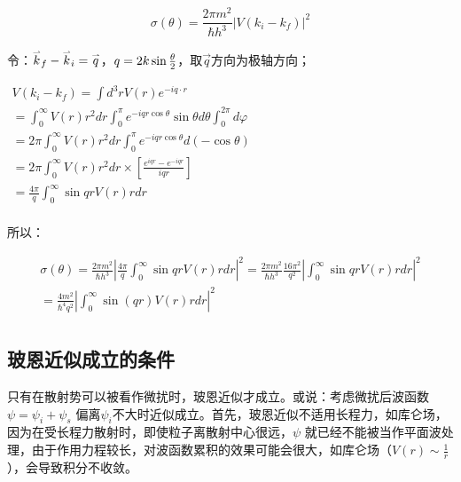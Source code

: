 \begin{equation}\label{27-5}
\sigma \left( \theta  \right) = \frac{{2\pi m^2 }}{{\hbar h^3 }}\left| {V(k_i  - k_f )} \right|^2
\end{equation}

令：$\mathord{\buildrel{\lower3pt\hbox{$\scriptscriptstyle\rightharpoonup$}}
\over k} _f  - \mathord{\buildrel{\lower3pt\hbox{$\scriptscriptstyle\rightharpoonup$}}
\over k} _i  = \mathord{\buildrel{\lower3pt\hbox{$\scriptscriptstyle\rightharpoonup$}}
\over q} $，$q = 2k\sin {\textstyle{\theta  \over 2}}$，取$\vec q$方向为极轴方向；


$\begin{array}{l}
 V(k_i  - k_f ) = \int {d^3 rV(r)e^{ - iq \cdot r} }  \\
 = \int_0^\infty  {V(r)r^2 dr} \int_0^\pi  {e^{ - iqr\cos \theta } \sin \theta d\theta } \int_0^{2\pi } {d\varphi }  \\
  = 2\pi \int_0^\infty  {V(r)r^2 dr} \int_0^\pi  {e^{ - iqr\cos \theta } d\left( { - \cos \theta } \right)}  \\
  = 2\pi \int_0^\infty  {V(r)r^2 dr}  \times \left[ {\frac{{e^{iqr}  - e^{ - iqr} }}{{iqr}}} \right] \\
  = \frac{{4\pi }}{q}\int_0^\infty  {\sin qrV(r)rdr}  \\
 \end{array}$


所以：

\begin{equation}\label{27-6}
\begin{array}{l}
 \sigma \left( \theta  \right) = \frac{{2\pi m^2 }}{{\hbar h^3 }}\left| {\frac{{4\pi }}{q}\int_0^\infty  {\sin qrV(r)rdr} } \right|^2  = \frac{{2\pi m^2 }}{{\hbar h^3 }}\frac{{16\pi ^2 }}{{q^2 }}\left| {\int_0^\infty  {\sin qrV(r)rdr} } \right|^2  \\
  = \frac{{4m^2 }}{{\hbar ^4 q^2 }}\left| {\int_0^\infty  {\sin (qr)V(r)rdr} } \right|^2  \\
 \end{array}
\end{equation}


\subsection{玻恩近似成立的条件}

只有在散射势可以被看作微扰时，玻恩近似才成立。或说：考虑微扰后波函数$\psi  = \psi _i  + \psi _s $
偏离$\psi_i$不大时近似成立。首先，玻恩近似不适用长程力，如库仑场，因为在受长程力散射时，即使粒子离散射中心很远，$\psi$ 就已经不能被当作平面波处理，由于作用力程较长，对波函数累积的效果可能会很大，如库仑场（$V(r) \sim \frac{1}{r}$），会导致积分不收敛。

